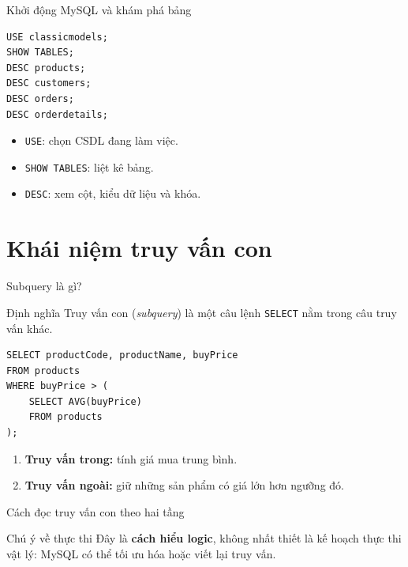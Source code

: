 \documentclass[aspectratio=169,10pt]{beamer}
\newcommand{\code}[1]{\texttt{#1}}
\begin{document}
\begin{frame}[fragile]{Khởi động MySQL và khám phá bảng}
\begin{lstlisting}
USE classicmodels;
SHOW TABLES;
DESC products;
DESC customers;
DESC orders;
DESC orderdetails;
\end{lstlisting}
\begin{itemize}
\item \code{USE}: chọn CSDL đang làm việc.
\item \code{SHOW TABLES}: liệt kê bảng.
\item \code{DESC}: xem cột, kiểu dữ liệu và khóa.
\end{itemize}
\end{frame}

\section{Khái niệm truy vấn con}

\begin{frame}[fragile]{Subquery là gì?}
\begin{block}{Định nghĩa}
Truy vấn con (\emph{subquery}) là một câu lệnh \code{SELECT} nằm trong câu truy vấn khác.
\end{block}
\begin{lstlisting}
SELECT productCode, productName, buyPrice
FROM products
WHERE buyPrice > (
    SELECT AVG(buyPrice)
    FROM products
);
\end{lstlisting}
\begin{enumerate}
\item \textbf{Truy vấn trong:} tính giá mua trung bình.
\item \textbf{Truy vấn ngoài:} giữ những sản phẩm có giá lớn hơn ngưỡng đó.
\end{enumerate}
\end{frame}

\begin{frame}[fragile]{Cách đọc truy vấn con theo hai tầng}
\begin{center}
\end{center}
\begin{alertblock}{Chú ý về thực thi}
Đây là \textbf{cách hiểu logic}, không nhất thiết là kế hoạch thực thi vật lý: MySQL có thể tối ưu hóa hoặc viết lại truy vấn.
\end{alertblock}
\end{frame}
\end{document}
